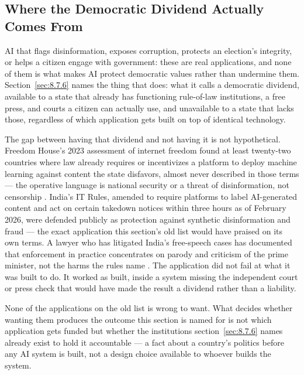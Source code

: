 \subsection{Where the Democratic Dividend Actually Comes From}
\label{sec:10.1.1}
AI that flags disinformation, exposes corruption, protects an election's integrity, or helps a citizen engage with government: these are real applications, and none of them is what makes AI protect democratic values rather than undermine them. Section~\ref{sec:8.7.6} names the thing that does: what it calls a democratic dividend, available to a state that already has functioning rule-of-law institutions, a free press, and courts a citizen can actually use, and unavailable to a state that lacks those, regardless of which application gets built on top of identical technology.

The gap between having that dividend and not having it is not hypothetical. Freedom House's 2023 assessment of internet freedom found at least twenty-two countries where law already requires or incentivizes a platform to deploy machine learning against content the state disfavors, almost never described in those terms — the operative language is national security or a threat of disinformation, not censorship \autocite{funk2023freedom}. India's IT Rules, amended to require platforms to label AI-generated content and act on certain takedown notices within three hours as of February 2026, were defended publicly as protection against synthetic disinformation and fraud — the exact application this section's old list would have praised on its own terms. A lawyer who has litigated India's free-speech cases has documented that enforcement in practice concentrates on parody and criticism of the prime minister, not the harms the rules name \autocite{gupta2026three}. The application did not fail at what it was built to do. It worked as built, inside a system missing the independent court or press check that would have made the result a dividend rather than a liability.

None of the applications on the old list is wrong to want. What decides whether wanting them produces the outcome this section is named for is not which application gets funded but whether the institutions section~\ref{sec:8.7.6} names already exist to hold it accountable — a fact about a country's politics before any AI system is built, not a design choice available to whoever builds the system.
